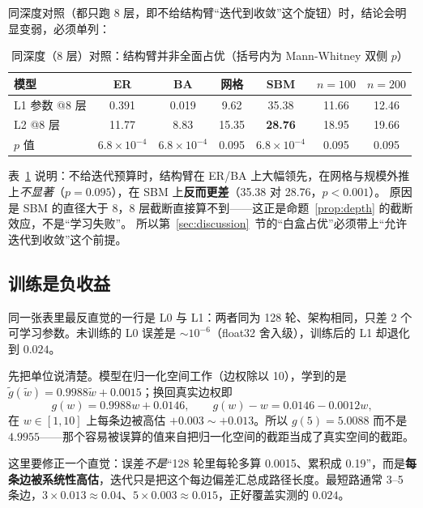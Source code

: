 同深度对照（都只跑 8 层，即不给结构臂“迭代到收敛”这个旋钮）时，结论会明显变弱，必须单列：

\begin{table}[H]
\centering
\caption{同深度（8 层）对照：结构臂并非全面占优（括号内为 Mann-Whitney 双侧 $p$）}
\label{tab:same}
\small
\setlength{\tabcolsep}{4pt}
\begin{tabular}{lcccccc}
\toprule
模型 & ER & BA & 网格 & SBM & $n{=}100$ & $n{=}200$ \\
\midrule
L1 参数 @8 层 & 0.391 & 0.019 & 9.62 & 35.38 & 11.66 & 12.46 \\
L2 @8 层 & 11.77 & 8.83 & 15.35 & \textbf{28.76} & 18.95 & 19.66 \\
\midrule
$p$ 值 & $6.8\times10^{-4}$ & $6.8\times10^{-4}$ & 0.095 & $6.8\times10^{-4}$ & 0.095 & 0.095 \\
\bottomrule
\end{tabular}
\end{table}

表~\ref{tab:same} 说明：不给迭代预算时，结构臂在 ER/BA 上大幅领先，在网格与规模外推上\emph{不显著}（$p=0.095$），在 SBM 上\textbf{反而更差}（35.38 对 28.76，$p<0.001$）。
原因是 SBM 的直径大于 8，8 层截断直接算不到——这正是命题~\ref{prop:depth} 的截断效应，不是“学习失败”。
所以第~\ref{sec:discussion}~节的“白盒占优”必须带上“允许迭代到收敛”这个前提。

\subsection{训练是负收益}\label{sec:negtrain}

同一张表里最反直觉的一行是 L0 与 L1：两者同为 128 轮、架构相同，只差 2 个可学习参数。未训练的 L0 误差是 $\sim10^{-6}$（float32 舍入级），训练后的 L1 却退化到 $0.024$。

先把单位说清楚。模型在归一化空间工作（边权除以 10），学到的是 $\tilde g(\tilde w)=0.9988\tilde w+0.0015$；换回真实边权即
\begin{equation}
g(w)=0.9988w+0.0146,\qquad g(w)-w=0.0146-0.0012w ,
\end{equation}
在 $w\in[1,10]$ 上每条边被高估 $+0.003\sim+0.013$。所以 $g(5)=5.0088$ 而不是 $4.9955$——那个容易被误算的值来自把归一化空间的截距当成了真实空间的截距。

这里要修正一个直觉：误差\emph{不是}“128 轮里每轮多算 0.0015、累积成 0.19”，而是\textbf{每条边被系统性高估}，迭代只是把这个每边偏差汇总成路径长度。最短路通常 3--5 条边，$3\times0.013\approx0.04$、$5\times0.003\approx0.015$，正好覆盖实测的 $0.024$。

